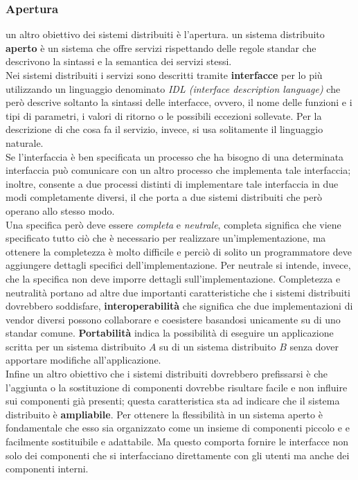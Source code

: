 \subsubsection{Apertura}
un altro obiettivo dei sistemi distribuiti è l'apertura. un sistema distribuito \textbf{aperto} è un sistema che offre servizi rispettando delle regole standar che descrivono la sintassi e la semantica dei servizi stessi.\\
Nei sistemi distribuiti i servizi sono descritti tramite \textbf{interfacce} per lo più utilizzando un linguaggio denominato \emph{IDL (interface description language)} che però descrive soltanto la sintassi delle interfacce, ovvero, il nome delle funzioni e i tipi di parametri, i valori di ritorno o le possibili eccezioni sollevate. Per la descrizione di che cosa fa il servizio, invece, si usa solitamente il linguaggio naturale.\\
Se l'interfaccia è ben specificata un processo che ha bisogno di una determinata interfaccia può comunicare con un altro processo che implementa tale interfaccia; inoltre, consente a due processi distinti di implementare tale interfaccia in due modi completamente diversi, il che porta a due sistemi distribuiti che però  operano allo stesso modo.\\
Una specifica però deve essere \emph{completa} e \emph{neutrale}, completa significa che viene specificato tutto ciò che è necessario per realizzare un'implementazione, ma ottenere la completezza è molto difficile e perciò di solito un programmatore deve aggiungere dettagli specifici dell'implementazione. Per neutrale si intende, invece, che la specifica non deve imporre dettagli sull'implementazione. Completezza e neutralità portano ad altre due importanti caratteristiche che i sistemi distribuiti dovrebbero soddisfare, \textbf{interoperabilità} che significa che due implementazioni di vendor diversi possono collaborare e coesistere basandosi unicamente su di uno standar comune. \textbf{Portabilità} indica la possibilità di eseguire un applicazione scritta per un sistema distribuito $A$ su di un sistema distribuito $B$ senza dover apportare modifiche all'applicazione.\\
Infine un altro obiettivo che i sistemi distribuiti dovrebbero prefissarsi è che l'aggiunta o la sostituzione di componenti dovrebbe risultare facile e non influire sui componenti già presenti; questa caratteristica sta ad indicare che il sistema distribuito è \textbf{ampliabile}.
Per ottenere la flessibilità in un sistema aperto è fondamentale che esso sia organizzato come un insieme di componenti piccolo e e facilmente sostituibile e adattabile. Ma questo comporta fornire le interfacce non solo dei componenti che si interfacciano direttamente con gli utenti ma anche dei componenti interni.
